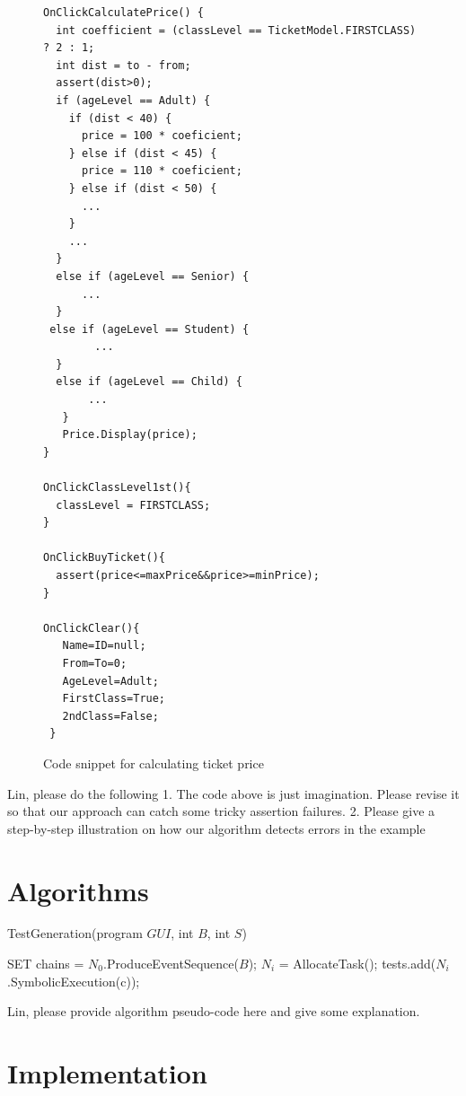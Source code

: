 \documentclass[blind]{sig-alternate-05-2015}
\begin{document}
\begin{figure}
\label{fig:code}
\begin{lstlisting}
OnClickCalculatePrice() {
  int coefficient = (classLevel == TicketModel.FIRSTCLASS) ? 2 : 1;
  int dist = to - from;
  assert(dist>0);
  if (ageLevel == Adult) {
    if (dist < 40) {
      price = 100 * coeficient;
    } else if (dist < 45) {
      price = 110 * coeficient;
    } else if (dist < 50) {
      ...
    } 
    ...  
  }
  else if (ageLevel == Senior) {
      ...
  }
 else if (ageLevel == Student) {
        ...
  }
  else if (ageLevel == Child) {
       ... 
   }      
   Price.Display(price);
}

OnClickClassLevel1st(){
  classLevel = FIRSTCLASS;
}

OnClickBuyTicket(){
  assert(price<=maxPrice&&price>=minPrice);
}

OnClickClear(){
   Name=ID=null;
   From=To=0;
   AgeLevel=Adult;
   FirstClass=True;
   2ndClass=False;
 }
\end{lstlisting}
\caption{Code snippet for calculating ticket price}
\end{figure}

Lin, please do the following
1. The code above is just imagination. Please revise it so that our approach can catch some tricky assertion failures.
2. Please give a step-by-step illustration on how our algorithm detects errors in the example

\section{Algorithms}

\begin{algorithm}[htbp]
\caption{TestGeneration(program $GUI$, int $B$, int $S$)}
\label{alg:top}
\begin{algorithmic}[1]
\STATE SET chains = $N_0$.ProduceEventSequence($B$); 
	\STATE $N_i$ = AllocateTask();
	\STATE tests.add($N_i$.SymbolicExecution(c));
\ENDFOR
\end{algorithmic}
\end{algorithm}


Lin, please provide algorithm pseudo-code here and give some explanation. 

\section{Implementation}
\end{document}
